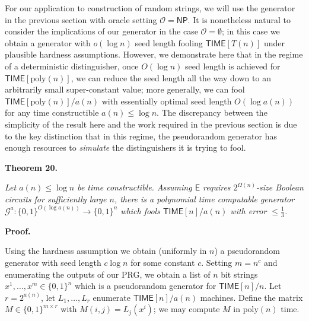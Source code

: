 \documentclass[10pt,a4paper]{article}
\begin{document}
For our application to construction of random strings, we will use the generator in the previous section with oracle setting $\mathcal{O}={\mathsf{NP}}$. It is nonetheless natural to consider the implications of our generator in the case $\mathcal{O}=\emptyset$; in this case we obtain a generator with $o(\log n)$ seed length fooling ${\mathsf{TIME}}[T(n)]$ under plausible hardness assumptions. However, we demonstrate here that in the regime of a deterministic distinguisher, once $O(\log n)$ seed length is achieved for ${\mathsf{TIME}}[\mathrm{poly}(n)]$, we can reduce the seed length all the way down to an arbitrarily small super-constant value; more generally, we can fool ${\mathsf{TIME}}[\mathrm{poly}(n)]/a(n)$ with essentially optimal seed length $O(\log a(n))$ for any time constructible $a(n)\leq\log n$.
The discrepancy between the simplicity of the result here and the work required in the previous section is due to the key distinction that in this regime, the pseudorandom generator has enough resources to \emph{simulate} the distinguishers it is trying to fool.\par





\par\medskip\noindent\textbf{
\textbf{Theorem 20}\textbf{.}
}\par



\emph{Let $a(n)\leq\log n$ be time constructible. Assuming $\mathsf{E}$ requires $2^{\Omega(n)}$-size Boolean circuits for sufficiently large $n$, there is a polynomial time computable generator $\mathcal{G}^{a}:\{0,1\}^{O(\log a(n))}\to\{0,1\}^{n}$ which fools ${\mathsf{TIME}}[n]/a(n)$ with error $\leq\frac{1}{3}$.}\par






\par\medskip\noindent\textbf{Proof.}\par




Using the hardness assumption we obtain (uniformly in $n$) a pseudorandom generator with seed length $c\log n$ for some constant $c$. Setting $m=n^{c}$ and enumerating the outputs of our PRG, we obtain a list of $n$ bit strings $x^{1},\ldots,x^{m}\in\{0,1\}^{n}$ which is a pseudorandom generator for ${\mathsf{TIME}}[n]/n$. Let $r=2^{a(n)}$, let $L_{1},\ldots,L_{r}$ enumerate ${\mathsf{TIME}}[n]/a(n)$ machines. Define the matrix $M\in\{0,1\}^{m\times r}$ with $M(i,j)=L_{j}(x^{i})$; we may compute $M$ in $\mathrm{poly}(n)$ time.\par
\end{document}

